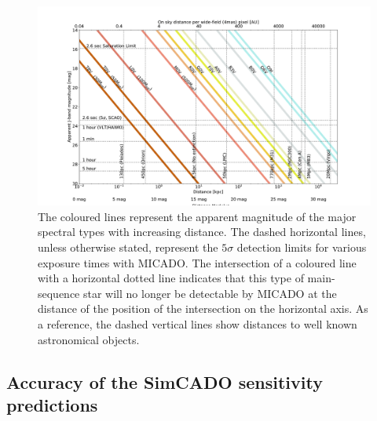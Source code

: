 \begin{figure}

    \centering
    \includegraphics[width=\textwidth]{images/spec_type_vs_dist_J}

    \caption{The coloured lines represent the apparent magnitude of the major spectral types with increasing distance. The dashed horizontal lines, unless otherwise stated, represent the $5\sigma$ detection limits for various exposure times with MICADO. The intersection of a coloured line with a horizontal dotted line indicates that this type of main-sequence star will no longer be detectable by MICADO at the distance of the position of the intersection on the horizontal axis. As a reference, the dashed vertical lines show distances to well known astronomical objects. 
    }
    
    \label{fig:MS_distances}
    
\end{figure}


\subsection{Accuracy of the SimCADO sensitivity predictions}
\label{subsec:MICADO_accuracy}

